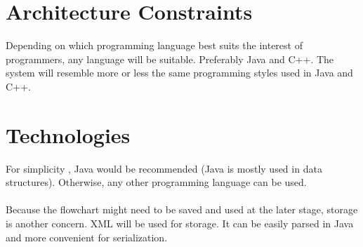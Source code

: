 \documentclass[12pt]{article}
\begin{document}
\section{Architecture Constraints}
Depending on which programming language best suits the interest of programmers, any language will be suitable. Preferably Java and C++. The system will resemble more or less the same programming styles used in Java and C++.


\section{Technologies}
For simplicity , Java would be recommended (Java is mostly used in data structures). Otherwise, any other programming language can be used.\\ \\
Because the flowchart might need to be saved and used at the later stage, storage is another concern. XML will be used for storage. It can be easily parsed in Java and more convenient for serialization.
\end{document}
